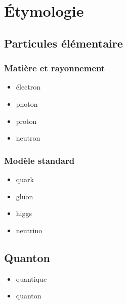 
\section{Étymologie}
%
\subsection{Particules élémentaire}

\subsubsection{Matière et rayonnement}

\begin{itemize}[leftmargin=1cm, label=, itemsep=1pt]
\item électron
\item photon
\item proton
\item neutron
\end{itemize}

\subsubsection{Modèle standard}

\begin{itemize}[leftmargin=1cm, label=, itemsep=1pt]
\item quark
\item gluon
\item higgs
\item neutrino
\end{itemize}



\subsection{Quanton}
%

\begin{itemize}[leftmargin=1cm, label=, itemsep=1pt]
\item quantique
\item quanton
\end{itemize}




